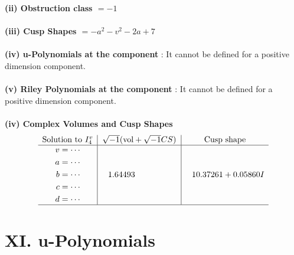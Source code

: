 \documentclass[1p]{elsarticle_modified}
\theoremstyle{definition}
\newcommand{\I}{\sqrt{-1}}
\begin{document}
\flushleft \textbf{(ii) Obstruction class $= -1$}\\~\\
\flushleft \textbf{(iii) Cusp Shapes $= - a^2- v^2-2 a+7$}\\~\\
\flushleft \textbf{(iv) u-Polynomials at the component} : It cannot be defined for a positive dimension component.\\~\\
\flushleft \textbf{(v) Riley Polynomials at the component} : It cannot be defined for a positive dimension component.\\~\\
\newpage\flushleft \textbf{(iv) Complex Volumes and Cusp Shapes}
$$\begin{array}{c|c|c} 
\text{Solution to }I^v_{4}& \I (\text{vol} + \sqrt{-1}CS) & \text{Cusp shape}\\
 \hline 
\begin{aligned}
v &= \cdots \\
a &= \cdots \\
b &= \cdots \\
c &= \cdots \\
d &= \cdots\end{aligned}
 & \phantom{-}1.64493\phantom{ +0.000000I} & \phantom{-}10.37261 + 0.05860 I\\
 \hline 
 \end{array}
$$
\newpage\renewcommand{\arraystretch}{1}
\centering \section*{ XI. u-Polynomials}
\end{document}
